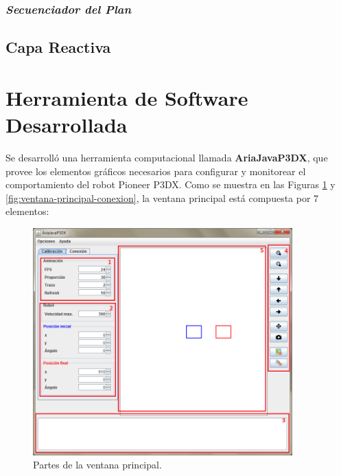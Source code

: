 \documentclass[11pt,twoside,A5]{article}
\begin{document}
\subsubsection*{\textit{Secuenciador del Plan}}

\subsection*{Capa Reactiva}

\pagebreak
\section*{Herramienta de Software Desarrollada}

Se desarrolló una herramienta computacional llamada \textbf{AriaJavaP3DX}, que provee los elementos gráficos necesarios para 
configurar y monitorear el comportamiento del robot Pioneer P3DX.
Como se muestra en las Figuras \ref{fig:ventana-principal-partes} y \ref{fig:ventana-principal-conexion}, la ventana principal está compuesta por 7 elementos:

\begin{figure}[H]
\begin{center}
\includegraphics[width=10cm]{ventana-principal-partes.png} 
\caption{Partes de la ventana principal.}
\label{fig:ventana-principal-partes}
\end{center}
\end{figure}
\end{document}
